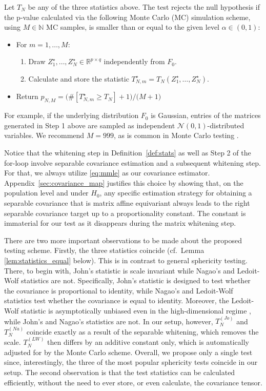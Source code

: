 \documentclass[12pt]{article}
\newcommand{\R}{\mathbb{R}}
\newcommand{\N}{\mathbb{N}}
\begin{document}
Let $T_N$ be any of the three statistics above. The test rejects the null hypothesis if the p-value calculated via the following Monte Carlo (MC) simulation scheme, using $M\in\N$ MC samples, is smaller than or equal to the given level $\alpha \in (0,1)$:

\newpage
\begin{itemize}
    \item For $m=1,\ldots,M$:
\begin{enumerate}
    \item Draw $Z_1^\star,\ldots,Z_N^\star \in \R^{p \times q}$ independently from $F_0$.
    \item Calculate and store the statistic $T_{N,m}^\star = T_N(Z_1^\star,\ldots,Z_N^\star)$.
\end{enumerate}
    \item Return $\widehat{p}_{N,M}=\big(\# [T_{N,m}^\star \geq T_N]+1\big)\big/\big(M+1\big)$
\end{itemize}
For example, if the underlying distribution $F_0$ is Gaussian, entries of the matrices generated in Step 1 above are sampled as independent $\mathcal{N}(0,1)$-distributed variables. We recommend $M=999$, as is common in Monte Carlo testing \citep{davison1997bootstrap}. 

Notice that the whitening step in Definition~\ref{def:stats} as well as  Step 2 of the for-loop involve separable covariance estimation and a subsequent whitening step. For that, we always utilize \eqref{eq:mmle} as our covariance estimator. Appendix~\ref{sec:covariance_map} justifies this choice by showing that, on the population level and under $H_0$, any specific estimation strategy for obtaining a separable covariance that is matrix affine equivariant always leads to the right separable covariance target up to a proportionality constant. The constant is immaterial for our test as it disappears during the matrix whitening step.

There are two more important observations to be made about the proposed testing scheme. Firstly, the three statistics coincide (cf.~Lemma \ref{lem:statistics_equal} below). This is in contrast to general sphericity testing. There, to begin with, John's statistic is scale invariant while Nagao's and Ledoit-Wolf statistics are not. Specifically, John's statistic is designed to test whether the covariance is proportional to identity, while Nagao's and Ledoit-Wolf statistics test whether the covariance is equal to identity. Moreover, the Ledoit-Wolf statistic is asymptotically unbiased even in the high-dimensional regime \citep{wang2013sphericity,li2018structure}, while John's and Nagao's statistics are not. In our setup, however, $T_N^{(Jo)}$ and $T_N^{(Na)}$ coincide exactly as a result of the separable whitening, which removes the scale. $T_N^{(LW)}$ then differs by an additive constant only, which is automatically adjusted for by the Monte Carlo scheme. Overall, we propose only a single test since, interestingly, the three of the most popular sphericity tests coincide in our setup. The second observation is that the test statistics can be calculated efficiently, without the need to ever store, or even calculate, the covariance tensor.
\end{document}
